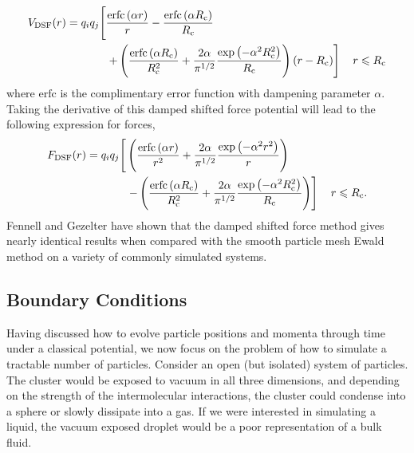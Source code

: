 \begin{equation}
\begin{split}
V_\mathrm{DSF}(r) = q_iq_j\Biggr{[} & \frac{\mathrm{erfc}\left(\alpha r \right)}{r} -\frac{\mathrm{erfc}\left(\alpha R_\mathrm{c} \right) }{R_\mathrm{c}} \\
 & \left. +\left(\frac{\mathrm{erfc}\left(\alpha
R_\mathrm{c}\right)}{R_\mathrm{c}^2}+\frac{2\alpha}{\pi^{1/2}}\frac{\exp\left(-\alpha^2R_\mathrm{c}^2\right)}{R_\mathrm{c}}\right)\left(r-R_\mathrm{c}\right)
\right] \quad r\leqslant R_\textrm{c} 
\label{eq:DSFPot}
\end{split}
\end{equation}
where $\mathrm{erfc}$ is the complimentary error function with dampening
parameter $\alpha$. Taking the derivative of this damped shifted force
potential will lead to the following expression for forces,
\begin{equation}
\begin{split}
F_\mathrm{DSF}(r) =
q_iq_j\Biggr{[}&\left(\frac{\textrm{erfc}\left(\alpha r\right)}{r^2}+\frac{2\alpha}{\pi^{1/2}}\frac{\exp{\left(-\alpha^2r^2\right)}}{r}\right) \\ &\left.-\left(\frac{\textrm{erfc}\left(\alpha R_{\textrm{c}}\right)}{R_{\textrm{c}}^2}+\frac{2\alpha}{\pi^{1/2}}\frac{\exp{\left(-\alpha^2R_{\textrm{c}}^2
\right)}}{R_{\textrm{c}}}\right)\right] \quad r\leqslant R_\textrm{c}.
\label{eq:DSFForces}
\end{split}
\end{equation}
Fennell and Gezelter have shown that the damped shifted force method
gives nearly identical results when compared with the smooth particle
mesh Ewald method on a variety of commonly simulated
systems.\cite{Fennell2006}

\subsection{Boundary Conditions}
Having discussed how to evolve particle positions and momenta through
time under a classical potential, we now focus on the problem of how
to simulate a tractable number of particles. Consider an open (but
isolated) system of particles. The cluster would be exposed to vacuum
in all three dimensions, and depending on the strength of the
intermolecular interactions, the cluster could condense into a sphere
or slowly dissipate into a gas. If we were interested in simulating a
liquid, the vacuum exposed droplet would be a poor representation of a
bulk fluid.

